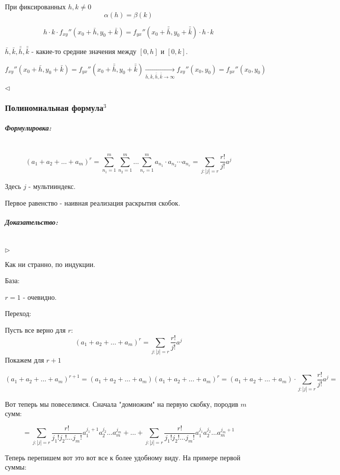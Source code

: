 \documentclass{article}
\let\vanillasubparagraph\subparagraph
\renewcommand{\subparagraph}[1]{\vanillasubparagraph{#1}\mbox{}\\}
\begin{document}
При фиксированных $h, k \neq 0$
$$
\alpha(h) = \beta(k)
$$

$$
h\cdot k\cdot f_{xy}''(x_0 + \bar h, y_0 + \bar k) = f_{yx}''(x_0 + \bar{\bar h}, y_0 + \bar{\bar k}) \cdot h \cdot k
$$

$\bar h, \bar k, \bar{\bar h}, \bar{\bar k}$ - какие-то средние значения между $[0, h]$ и $[0, k]$.

$$
f_{xy}'' (x_0 + \bar h, y_0 + \bar k) = f_{yx}''(x_0 + \bar{\bar h}, y_0 + \bar{\bar k}) \underset {\bar h, \bar k, \bar{\bar h}, \bar {\bar k} \to \infty}{\to} f_{xy}''(x_0, y_0) = f_{yx}''(x_0, y_0)
$$

$\lhd$


\subsubsection{Полиномиальная формула\texorpdfstring{$^3$}{}}

\subparagraph{Формулировка: }

$$
(a_1 + a_2 + \dots + a_m)^r = \sum_{n_1 = 1}^m\sum_{n_2 = 1}^m \dots \sum_{n_r = 1}^m a_{n_1} \cdot a_{n_2} \cdots a_{n_r} = \sum_{j: |j| = r} \frac {r!}{j!} a^j
$$

Здесь $j$ - мультииндекс.

Первое равенство - наивная реализация раскрытия скобок.

\subparagraph{Доказательство: }

$\rhd$

Как ни странно, по индукции.

База:

$r = 1$ - очевидно.

Переход:

Пусть все верно для $r$: 
$$
(a_1 + a_2 + \dots + a_m)^r = \sum_{j: |j| = r} \frac {r!}{j!} a^j
$$
Покажем для $r + 1$

$$
(a_1 + a_2 + \dots + a_m)^{r+1} = (a_1 + a_2 + \dots + a_m) (a_1 + a_2 + \dots + a_m)^r = (a_1 + a_2 + \dots + a_m) \cdot \sum_{j: |j| = r} \frac{r!}{j!} a^j = 
$$

Вот теперь мы повеселимся. Сначала "домножим" на первую скобку, породив $m$ сумм: 

$$
= \sum_{j: |j| = r} \frac{r!}{j_1!j_2!\dots j_m!} a^{j_1 + 1}_1 a^{j_2}_2 \dots a^{j_m}_m + \dots + \sum_{j: |j| = r} \frac{r!}{j_1!j_2!\dots j_m!} a^{j_1}_1 a^{j_2}_2\dots a^{j_m + 1}_m
$$

Теперь перепишем вот это вот все к более удобному виду. На примере первой суммы:
\end{document}
